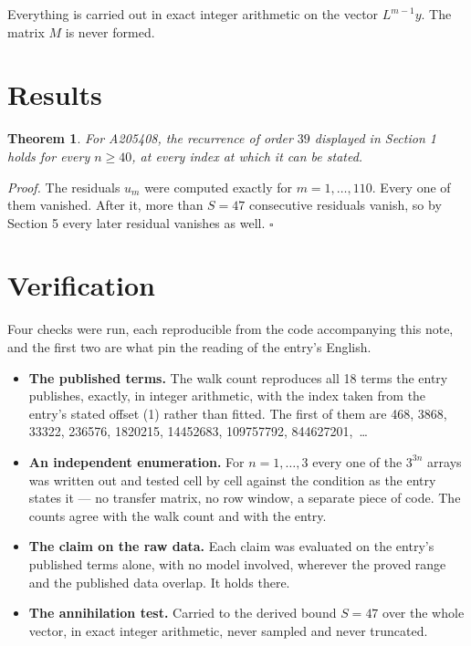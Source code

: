 \documentclass[11pt]{article}
\newtheorem{theorem}{Theorem}
\theoremstyle{definition}
\begin{document}
Everything is carried out in exact integer arithmetic on the vector $L^{m-1}y$. The matrix $M$ is never formed.

\section{Results}

\begin{theorem} For A205408, the recurrence of order $39$ displayed in Section 1 holds for every $n \ge 40$, at every index at which it can be stated.\end{theorem}

{\itshape Proof.} The residuals $u_m$ were computed exactly for $m = 1,\dots,110$. Every one of them vanished. After it, more than $S = 47$ consecutive residuals vanish, so by Section 5 every later residual vanishes as well. $\square$

\section{Verification}

Four checks were run, each reproducible from the code accompanying this note, and the first two are what pin the reading of the entry's English.

\begin{itemize}

\item {\bfseries The published terms.} The walk count reproduces all 18 terms the entry publishes, exactly, in integer arithmetic, with the index taken from the entry's stated offset (1) rather than fitted. The first of them are 468, 3868, 33322, 236576, 1820215, 14452683, 109757792, 844627201,~\dots

\item {\bfseries An independent enumeration.} For $n = 1,\dots,3$ every one of the $3^{3n}$ arrays was written out and tested cell by cell against the condition as the entry states it --- no transfer matrix, no row window, a separate piece of code. The counts agree with the walk count and with the entry.

\item {\bfseries The claim on the raw data.} Each claim was evaluated on the entry's published terms alone, with no model involved, wherever the proved range and the published data overlap. It holds there.

\item {\bfseries The annihilation test.} Carried to the derived bound $S = 47$ over the whole vector, in exact integer arithmetic, never sampled and never truncated.

\end{itemize}
\end{document}
